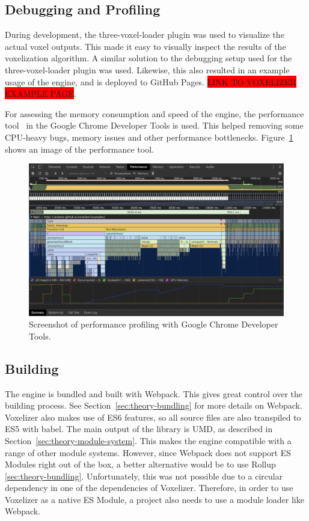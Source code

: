 \subsection{Debugging and Profiling}
During development, the three-voxel-loader plugin was used to visualize the actual voxel outputs. This made it easy to visually inspect the results of the voxelization algorithm. A similar solution to the debugging setup used for the three-voxel-loader plugin was used. Likewise, this also resulted in an example usage of the engine, and is deployed to GitHub Pages. \colorbox{red}{LINK TO VOXELIZER EXAMPLE PAGE}.

For assessing the memory consumption and speed of the engine, the performance tool~\cite{chrome-dev-tools-profiler} in the Google Chrome Developer Tools is used. This helped removing some CPU-heavy bugs, memory issues and other performance bottlenecks. Figure~\ref{fig:chrome-devtools-performance} shows an image of the performance tool.

\begin{figure}[ht]
    \centering
    \includegraphics[width=\textwidth]{sections/methodology/figures/chrome-dev-tools-performance.png}
    \caption{Screenshot of performance profiling with Google Chrome Developer Tools.}
    \label{fig:chrome-devtools-performance}
\end{figure}

\subsection{Building}
The engine is bundled and built with Webpack. This gives great control over the building process. See Section~\ref{sec:theory-bundling} for more details on Webpack. Voxelizer also makes use of ES6 features, so all source files are also transpiled to ES5 with babel. The main output of the library is UMD, as described in Section~\ref{sec:theory-module-system}. This makes the engine compatible with a range of other module systems. However, since Webpack does not support ES Modules right out of the box, a better alternative would be to use Rollup \ref{sec:theory-bundling}. Unfortunately, this was not possible due to a circular dependency in one of the dependencies of Voxelizer. Therefore, in order to use Voxelizer as a native ES Module, a project also needs to use a module loader like Webpack.

